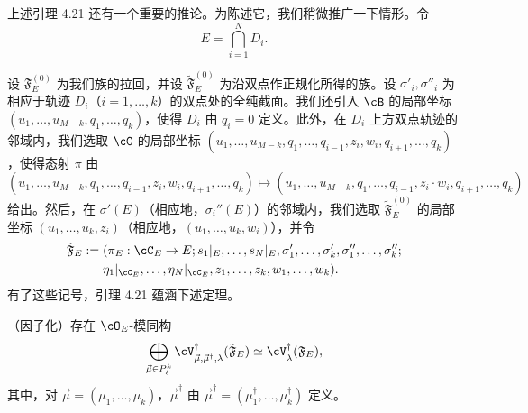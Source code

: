 上述引理 4.21 还有一个重要的推论。为陈述它，我们稍微推广一下情形。令
\[
 E=\bigcap_{i=1}^{N}D_i.
\]


设 $\mathfrak F^{(0)}_E$ 为我们族的拉回，并设 $\tilde{\mathfrak F}^{(0)}_E$ 为沿双点作正规化所得的族。设 $\sigma'_i,\sigma''_i$ 为相应于轨迹 $D_i$（$i=1,\dots,k$）的双点处的全纯截面。我们还引入 $\cB$ 的局部坐标 $(u_1,\dots,u_{M-k},q_1,\dots,q_k)$，使得 $D_i$ 由 $q_i=0$ 定义。此外，在 $D_i$ 上方双点轨迹的邻域内，我们选取 $\cC$ 的局部坐标 $(u_1,\dots,u_{M-k},q_1,\dots,q_{i-1},z_i,w_i,q_{i+1},\dots,q_k)$，使得态射 $\pi$ 由
\[
 (u_1,\dots,u_{M-k},q_1,\dots,q_{i-1},z_i,w_i,q_{i+1},\dots,q_k)
 \mapsto(u_1,\dots,u_{M-k},q_1,\dots,q_{i-1},z_i\cdot w_i,q_{i+1},\dots,q_k)
\]
给出。然后，在 $\sigma'(E)$（相应地，$\sigma_i''(E)$）的邻域内，我们选取 $\tilde{\mathfrak F}^{(0)}_E$ 的局部坐标 $(u_1,\dots,u_k,z_i)$（相应地，$(u_1,\dots,u_k,w_i)$），并令
\begin{align*}
 \tilde{\mathfrak F}_E:={}&(\pi_E:\cC_E\to E;s_1|_E,\dots,s_N|_E,
 \sigma'_1,\dots,\sigma'_k,\sigma''_1,\dots,\sigma''_k;\\
 &\eta_1|_{\cC_E},\dots,\eta_N|_{\cC_E},z_1,\dots,z_k,w_1,\dots,w_k).
\end{align*}
有了这些记号，引理 4.21 蕴涵下述定理。

\begin{theorem}[4.22]
 （因子化）存在 $\cO_E$-模同构
 \[
  \bigoplus_{\vec\mu\in P_\ell^k}\cV^\dagger_{\vec\mu,\vec\mu^\dagger,\tilde\lambda}(\tilde{\mathfrak F}_E)
  \simeq\cV^\dagger_{\tilde\lambda}(\mathfrak F_E),
 \]
 其中，对 $\vec\mu=(\mu_1,\dots,\mu_k)$，$\vec\mu^\dagger$ 由 $\vec\mu^\dagger=(\mu_1^\dagger,\dots,\mu_k^\dagger)$ 定义。
\end{theorem}

